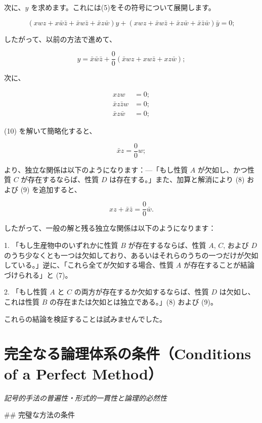 \documentclass[a4paper,11pt,openany]{ltjsbook}
\begin{document}
次に、$y$ を求めます。これには(5)をその符号について展開します。

\[
(xwz + x\bar{w}\bar{z} + \bar{x}w\bar{z} + \bar{x}z\bar{w})y + (xwz + \bar{x}w\bar{z} + \bar{x}z\bar{w} + \bar{x}\bar{z}\bar{w})\bar{y} = 0;
\]

したがって、以前の方法で進めて、

\[
y = \bar{x}\bar{w}\bar{z} + \frac{0}{0}(\bar{x}wz + xw\bar{z} + xz\bar{w});
\]

次に、

\begin{eqnarray}
xzw &= 0;\\
\bar{x}z\bar{z}w &= 0;\\
\bar{x}z\bar{w} &= 0;
\end{eqnarray}

(10) を解いて簡略化すると、

\[
\bar{x}z = \frac{0}{0}w;
\]

より、独立な関係は以下のようになります：—「もし性質 $A$ が欠如し、かつ性質 $C$ が存在するならば、性質 $D$ は存在する。」また、加算と解消により (8) および (9) を追加すると、

\[
xz + \bar{x}\bar{z} = \frac{0}{0} \bar{w}.
\]

したがって、一般の解と残る独立な関係は以下のようになります：

1. 「もし生産物中のいずれかに性質 $B$ が存在するならば、性質 $A$, $C$, および $D$ のうち少なくとも一つは欠如しており、あるいはそれらのうちの一つだけが欠如している。」逆に、「これら全てが欠如する場合、性質 $A$ が存在することが結論づけられる」と (7)。

2. 「もし性質 $A$ と $C$ の両方が存在するか欠如するならば、性質 $D$ は欠如し、これは性質 $B$ の存在または欠如とは独立である。」(8) および (9)。

これらの結論を検証することは試みませんでした。

\newpage

\chapter{完全なる論理体系の条件（Conditions of a Perfect Method）}
\label{ch:x}

\begin{center}
\large\textit{記号的手法の普遍性・形式的一貫性と論理的必然性}
\end{center}
\vspace{4mm}

\#\# 完璧な方法の条件
\end{document}
